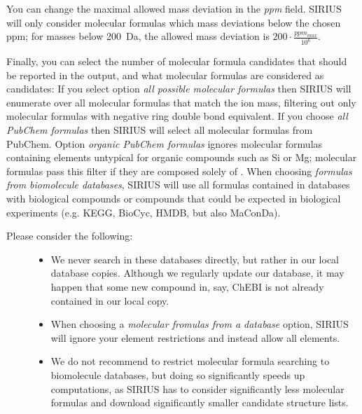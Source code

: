 \documentclass[letterpaper,10pt,openany,oneside]{sphinxmanual}
\newcommand{\todo}[1]{}
\newcommand\gui[1]{\textsl{\guilsinglleft#1\guilsinglright\xspace}}
\begin{document}
You can change the maximal allowed mass deviation in the \gui{ppm}
field. SIRIUS will only consider molecular formulas which mass deviations
below the chosen ppm; for masses below 200~Da, the allowed mass deviation
is \(200 \cdot \frac{ppm_{max}}{10^6}\).

Finally, you can select the number of molecular formula candidates that
should be reported in the output, and what molecular formulas are considered
as candidates: If you select option \gui{all possible molecular
formulas} then SIRIUS will enumerate over all molecular formulas that
match the ion mass, filtering out only molecular formulas with negative ring
double bond equivalent. If you choose \gui{all PubChem formulas} then
SIRIUS will select all molecular formulas from PubChem.  Option
\gui{organic PubChem formulas} ignores molecular formulas containing
elements untypical for organic compounds such as Si or Mg; molecular formulas
pass this filter if they are composed solely of .  When
choosing \gui{formulas from biomolecule databases}, \todo{change name of
option in program, biomolecule instead of biological!} SIRIUS will use all
formulas contained in databases with biological compounds or compounds that
could be expected in biological experiments (e.g. KEGG, BioCyc, HMDB, but
also MaConDa).
%
\begin{description}
\item[{Please consider the following:}] \leavevmode\begin{itemize}
\item {} 
We never search in these databases directly, but rather in our local database
copies. Although we regularly update our database, it may happen that some
new compound in, say, ChEBI is not already contained in our local copy.

\item {} 
When choosing a \gui{molecular fromulas from a database} option, SIRIUS
will ignore your element restrictions and instead allow all elements.

\item {} 
We do not recommend to restrict molecular formula searching to biomolecule
databases, but doing so significantly speeds up computations, as SIRIUS has
to consider significantly less molecular formulas and download significantly
smaller candidate structure lists.
\end{itemize}
\end{description}


\end{document}

